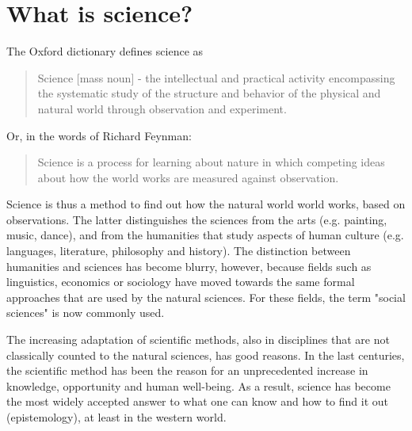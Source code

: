 \documentclass{tufte-book}
\begin{document}
\section{What is science?}

The Oxford dictionary defines science as 

\begin{quote}
Science [mass noun] - the intellectual and practical activity encompassing the systematic study of the structure and behavior of the physical and natural world through observation and experiment.
\end{quote}

\noindent Or, in the words of Richard Feynman:

\begin{quote}
Science is a process for learning about nature in which competing ideas about how the world works are measured against observation.
\end{quote}

Science is thus a method to find out how the natural world world works, based on observations. The latter distinguishes the sciences from the arts (e.g. painting, music, dance), and from the humanities that study aspects of human culture (e.g. languages, literature, philosophy and history).
 The distinction between humanities and sciences has become blurry, however, because fields such as linguistics, economics or sociology have moved towards the same formal approaches that are used by the natural sciences. For these fields, the term "social sciences" is now commonly used. 

The increasing adaptation of scientific methods, also in disciplines that are not classically counted to the natural sciences, has good reasons. In the last centuries, the scientific method has been the reason for an unprecedented increase in knowledge, opportunity and human well-being. As a result, science has become the most widely accepted answer to what one can know and how to find it out (epistemology), at least in the western world. 
\end{document}
